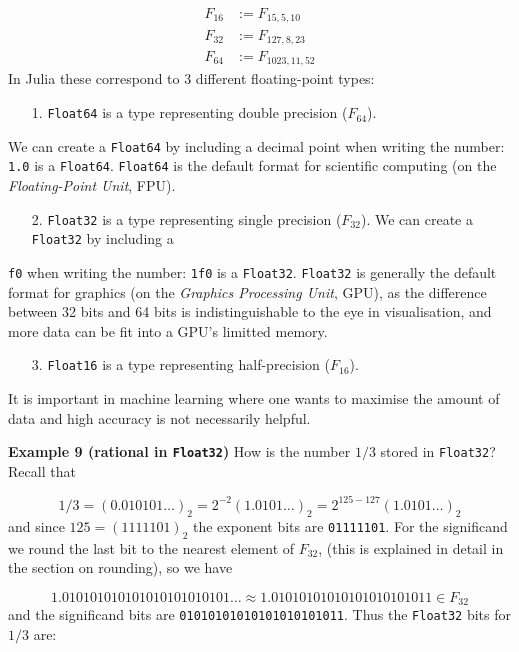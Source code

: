 \documentclass[12pt,a4paper]{article}
\begin{document}
\begin{align*}
F_{16} &:= F_{15,5,10} \\
F_{32} &:= F_{127,8,23} \\
F_{64} &:= F_{1023,11,52}
\end{align*}
In Julia these correspond to 3 different floating-point types:

\begin{itemize}
\item[1. ] \texttt{Float64} is a type representing double precision ($F_{64}$).

\end{itemize}
We can create a \texttt{Float64} by including a decimal point when writing the number: \texttt{1.0} is a \texttt{Float64}. \texttt{Float64} is the default format for scientific computing (on the \emph{Floating-Point Unit}, FPU).

\begin{itemize}
\item[2. ] \texttt{Float32} is a type representing single precision ($F_{32}$).  We can create a \texttt{Float32} by including a

\end{itemize}
\texttt{f0} when writing the number: \texttt{1f0} is a \texttt{Float32}. \texttt{Float32} is generally the default format for graphics (on the \emph{Graphics Processing Unit}, GPU), as the difference between 32 bits and 64 bits is indistinguishable to the eye in visualisation, and more data can be fit into a GPU's limitted memory.

\begin{itemize}
\item[3. ] \texttt{Float16} is a type representing half-precision ($F_{16}$).

\end{itemize}
It is important in machine learning where one wants to maximise the amount of data and high accuracy is not necessarily helpful.

\textbf{Example 9 (rational in \texttt{Float32})} How is the number $1/3$ stored in \texttt{Float32}? Recall that

\[
1/3 = (0.010101\ldots)_2 = 2^{-2} (1.0101\ldots)_2 = 2^{125-127} (1.0101\ldots)_2
\]
and since $125 = (1111101)_2$  the exponent bits are \texttt{01111101}. For the significand we round the last bit to the nearest element of $F_{32}$, (this is explained in detail in the section on rounding), so we have

\[
1.010101010101010101010101\ldots \approx 1.01010101010101010101011 \in F_{32}
\]
and the significand bits are \texttt{01010101010101010101011}. Thus the \texttt{Float32} bits for $1/3$ are:
\end{document}
